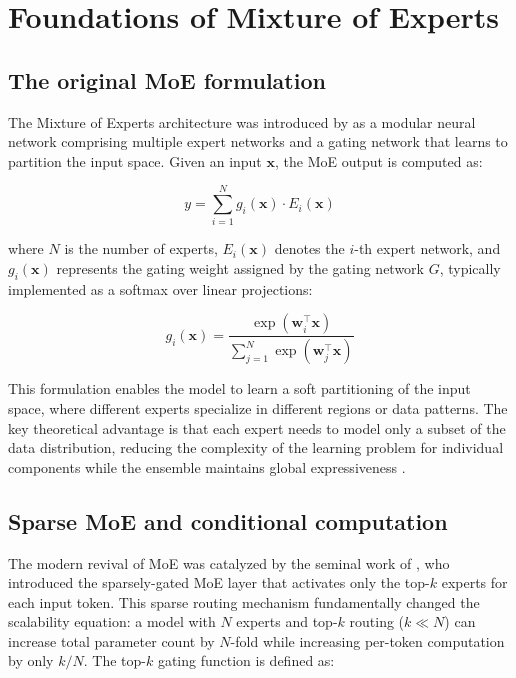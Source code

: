 
\section*{Foundations of Mixture of Experts}

\subsection*{The original MoE formulation}

The Mixture of Experts architecture was introduced by \cite{jacobs1991adaptive} as a modular neural network comprising multiple expert networks and a gating network that learns to partition the input space. Given an input $\mathbf{x}$, the MoE output is computed as:

\begin{equation}
    y = \sum_{i=1}^{N} g_i(\mathbf{x}) \cdot E_i(\mathbf{x})
\end{equation}

\noindent where $N$ is the number of experts, $E_i(\mathbf{x})$ denotes the $i$-th expert network, and $g_i(\mathbf{x})$ represents the gating weight assigned by the gating network $G$, typically implemented as a softmax over linear projections:

\begin{equation}
    g_i(\mathbf{x}) = \frac{\exp(\mathbf{w}_i^\top \mathbf{x})}{\sum_{j=1}^{N} \exp(\mathbf{w}_j^\top \mathbf{x})}
\end{equation}

This formulation enables the model to learn a soft partitioning of the input space, where different experts specialize in different regions or data patterns. The key theoretical advantage is that each expert needs to model only a subset of the data distribution, reducing the complexity of the learning problem for individual components while the ensemble maintains global expressiveness \cite{yuksel2012twenty}.

\subsection*{Sparse MoE and conditional computation}

The modern revival of MoE was catalyzed by the seminal work of \cite{shazeer2017outrageously}, who introduced the sparsely-gated MoE layer that activates only the top-$k$ experts for each input token. This sparse routing mechanism fundamentally changed the scalability equation: a model with $N$ experts and top-$k$ routing ($k \ll N$) can increase total parameter count by $N$-fold while increasing per-token computation by only $k/N$. The top-$k$ gating function is defined as:

